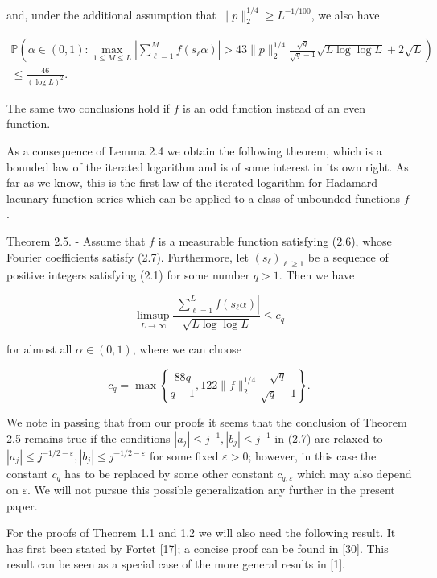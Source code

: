 \documentclass[10pt]{article}
\newcommand{\1}{\mathbf{1}}
\begin{document}
and, under the additional assumption that $\|p\|_{2}^{1 / 4} \geqslant L^{-1 / 100}$, we also have

$$
\begin{array}{r}
\mathbb{P}\left(\alpha \in(0,1): \max _{1 \leqslant M \leqslant L}\left|\sum_{\ell=1}^{M} f\left(s_{\ell} \alpha\right)\right|>43\|p\|_{2}^{1 / 4} \frac{\sqrt{q}}{\sqrt{q}-1} \sqrt{L \log \log L}+2 \sqrt{L}\right) \\
\leqslant \frac{46}{(\log L)^{2}} .
\end{array}
$$

The same two conclusions hold if $f$ is an odd function instead of an even function.

As a consequence of Lemma 2.4 we obtain the following theorem, which is a bounded law of the iterated logarithm and is of some interest in its own right. As far as we know, this is the first law of the iterated logarithm for Hadamard lacunary function series which can be applied to a class of unbounded functions $f$.

Theorem 2.5. - Assume that $f$ is a measurable function satisfying (2.6), whose Fourier coefficients satisfy (2.7). Furthermore, let $\left(s_{\ell}\right)_{\ell \geqslant 1}$ be a sequence of positive integers satisfying (2.1) for some number $q>1$. Then we have

$$
\limsup _{L \rightarrow \infty} \frac{\left|\sum_{\ell=1}^{L} f\left(s_{\ell} \alpha\right)\right|}{\sqrt{L \log \log L}} \leqslant c_{q}
$$

for almost all $\alpha \in(0,1)$, where we can choose

$$
c_{q}=\max \left\{\frac{88q}{q-1}, 122\|f\|_{2}^{1 / 4} \frac{\sqrt{q}}{\sqrt{q}-1}\right\} .
$$

We note in passing that from our proofs it seems that the conclusion of Theorem 2.5 remains true if the conditions $\left|a_{j}\right| \leqslant j^{-1},\left|b_{j}\right| \leqslant j^{-1}$ in (2.7) are relaxed to $\left|a_{j}\right| \leqslant j^{-1 / 2-\varepsilon},\left|b_{j}\right| \leqslant j^{-1 / 2-\varepsilon}$ for some fixed $\varepsilon>0$; however, in this case the constant $c_{q}$ has to be replaced by some other constant $c_{q, \varepsilon}$ which may also depend on $\varepsilon$. We will not pursue this possible generalization any further in the present paper.

For the proofs of Theorem 1.1 and 1.2 we will also need the following result. It has first been stated by Fortet [17]; a concise proof can be found in [30]. This result can be seen as a special case of the more general results in [1].
\end{document}
